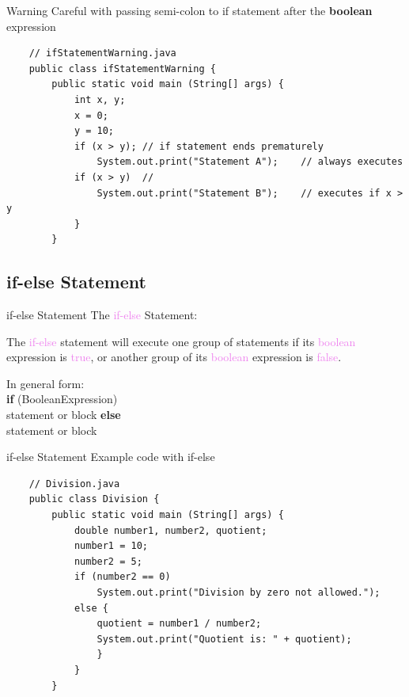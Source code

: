 \documentclass[11pt]{beamer}
\newcommand{\violet}[1]{\textcolor{violet}{#1}}
\begin{document}
\begin{frame}[fragile]{Warning}
    Careful with passing semi-colon to if statement after the \textbf{boolean} expression
    \begin{lstlisting}
    // ifStatementWarning.java
    public class ifStatementWarning {
    	public static void main (String[] args) {
    		int x, y;
    		x = 0; 
    		y = 10;
    		if (x > y);	// if statement ends prematurely
    			System.out.print("Statement A");	// always executes
    		if (x > y)	//
    			System.out.print("Statement B");	// executes if x > y
    		}
        }
    \end{lstlisting}
\end{frame}

\subsection{if-else Statement}
\begin{frame}{if-else Statement}
    The \violet{if-else} Statement:
    \begin{center}
        The \violet{if-else} statement will execute one group of statements if its \violet{boolean} expression is \violet{true}, or another group of its \violet{boolean} expression is \violet{false}.
    \end{center}
    In general form: \\

    \noindent
    \textbf{if} (BooleanExpression) \\
    \hspace{1em} statement or block
    \flushleft \textbf{else} \\ 
    \hspace{1em} statement or block
\end{frame}

\begin{frame}[fragile]{if-else Statement}
    Example code with if-else
        \begin{lstlisting}
    // Division.java
    public class Division {
    	public static void main (String[] args) {
    		double number1, number2, quotient;
    		number1 = 10;
    		number2 = 5;
    		if (number2 == 0)
    			System.out.print("Division by zero not allowed.");
    		else {
    			quotient = number1 / number2;
    			System.out.print("Quotient is: " + quotient);
    			}
    		}
        }
    \end{lstlisting}
\end{frame}
\end{document}
